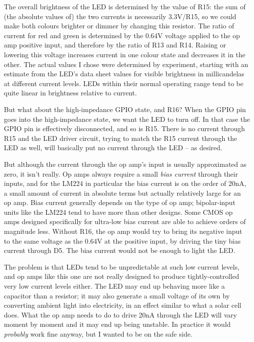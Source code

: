 The overall brightness of the LED is determined by the value of R15:  the
sum of (the absolute values of) the two currents is necessarily 3.3V$/$R15,
so we could make both colours brighter or dimmer by changing this resistor. 
The ratio of current for red and green is determined by the 0.64V voltage
applied to the op amp positive input, and therefore by the ratio of R13 and
R14.  Raising or lowering this voltage increases current in one colour state
and decreases it in the other.  The actual values I chose were determined by
experiment, starting with an estimate from the LED's data sheet values for
visible brightness in millicandelas at different current levels.  LEDs
within their normal operating range tend to be quite linear in brightness
relative to current.

But what about the high-impedance GPIO state, and R16?  When the GPIO pin
goes into the high-impedance state, we want the LED to turn off.  In that
case the GPIO pin is effectively disconnected, and so is R15.  There is no
current through R15 and the LED driver circuit, trying to match the R15
current through the LED as well, will basically put no current through the
LED -- as desired.

But although the current through the op amp's input is usually approximated
as zero, it isn't really.  Op amps always require a small \emph{bias
current} through their inputs, and for the LM224 in particular the bias
current is on the order of 20nA, a small amount of current in absolute terms
but actually relatively large for an op amp.  Bias current generally depends
on the type of op amp; bipolar-input units like the LM224 tend to have more
than other designs.  Some CMOS op amps designed specifically for ultra-low
bias current are able to achieve orders of magnitude less.  Without R16, the
op amp would try to bring its negative input to the same voltage as the
0.64V at the positive input, by driving the tiny bias current through D5. 
The bias current would not be enough to light the LED.

The problem is that LEDs tend to be unpredictable at such low current
levels, and op amps like this one are not really designed to produce
tightly-controlled very low current levels either.  The LED may end up
behaving more like a capacitor than a resistor; it may also generate a small
voltage of its own by converting ambient light into electricity, in an
effect similar to what a solar cell does.  What the op amp needs to do to
drive 20nA through the LED will vary moment by moment and it may end up
being unstable.  In practice it would \emph{probably} work fine anyway, but
I wanted to be on the safe side.

